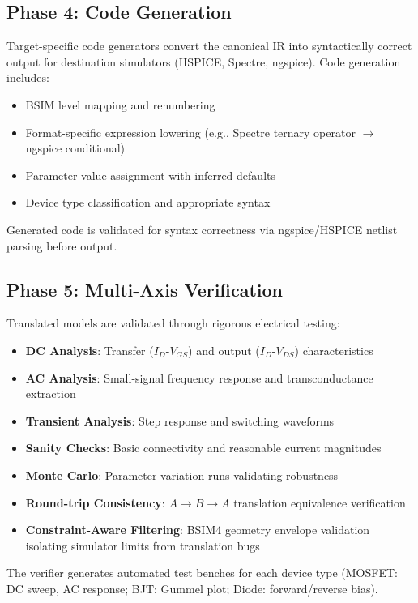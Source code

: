 \documentclass[conference]{IEEEtran}
\begin{document}
\subsection{Phase 4: Code Generation}

Target-specific code generators convert the canonical IR into syntactically correct output for destination simulators (HSPICE, Spectre, ngspice). Code generation includes:
\begin{itemize}
\item BSIM level mapping and renumbering
\item Format-specific expression lowering (e.g., Spectre ternary operator $\rightarrow$ ngspice conditional)
\item Parameter value assignment with inferred defaults
\item Device type classification and appropriate syntax
\end{itemize}

Generated code is validated for syntax correctness via ngspice/HSPICE netlist parsing before output.

\subsection{Phase 5: Multi-Axis Verification}

Translated models are validated through rigorous electrical testing:
\begin{itemize}
\item \textbf{DC Analysis}: Transfer ($I_D$-$V_{GS}$) and output ($I_D$-$V_{DS}$) characteristics
\item \textbf{AC Analysis}: Small-signal frequency response and transconductance extraction
\item \textbf{Transient Analysis}: Step response and switching waveforms
\item \textbf{Sanity Checks}: Basic connectivity and reasonable current magnitudes
\item \textbf{Monte Carlo}: Parameter variation runs validating robustness
\item \textbf{Round-trip Consistency}: $A \rightarrow B \rightarrow A$ translation equivalence verification
\item \textbf{Constraint-Aware Filtering}: BSIM4 geometry envelope validation isolating simulator limits from translation bugs
\end{itemize}

The verifier generates automated test benches for each device type (MOSFET: DC sweep, AC response; BJT: Gummel plot; Diode: forward/reverse bias).
\end{document}
